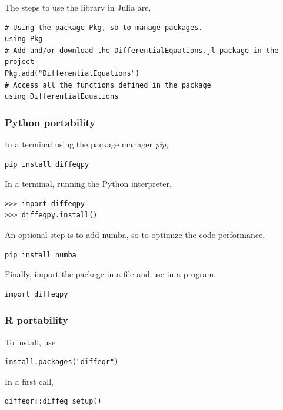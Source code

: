 \documentclass[
12pt,				%
openright,			%
oneside,			%
a4paper,			%
brazil,				%
english,			%
]{abntex2}
\begin{document}
The steps to use the library in Julia are,

\begin{verbatim}
# Using the package Pkg, so to manage packages. 
using Pkg
# Add and/or download the DifferentialEquations.jl package in the project 
Pkg.add("DifferentialEquations")
# Access all the functions defined in the package 
using DifferentialEquations
\end{verbatim}

\subsubsection{Python portability}

In a terminal using the package manager \textit{pip},
\begin{verbatim}
pip install diffeqpy
\end{verbatim}

In a terminal, running the Python interpreter,
\begin{verbatim}
>>> import diffeqpy
>>> diffeqpy.install()
\end{verbatim}

An optional step is to add numba, so to optimize the code performance,
\begin{verbatim}
pip install numba
\end{verbatim}

Finally, import the package in a file and use in a program.
\begin{verbatim}
import diffeqpy
\end{verbatim}

\subsubsection{R portability}

To install, use
\begin{verbatim}
install.packages("diffeqr")
\end{verbatim}

In a first call,
\begin{verbatim}
diffeqr::diffeq_setup()
\end{verbatim}
\end{document}
